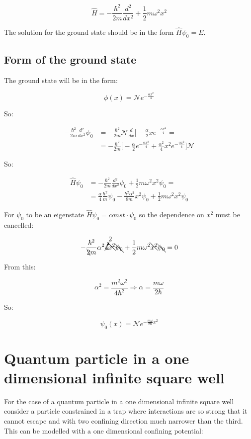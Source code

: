 $$\hat{H} = - \frac{\hbar^2}{2m}\frac{d{^2}}{d{x^2}} +\frac{1}{2}m\omega^2 x^2$$

The solution for the ground state should be in the form $\hat{H}\psi_0 = E$.

  \subsection{Form of the ground state}
  The ground state will be in the form:

  $$\phi(x) = \mathcal{N}e^{-\frac{\alpha x^2}{4}}$$

  So:

  \begin{align*}
    -\frac{\hbar^2}{2m}\frac{d{^2}}{d{x^2}}\psi_0 &= -\frac{\hbar^2}{2m}\mathcal{N}\frac{d{}}{d{x}}\biggl[-\frac{\alpha}{2}xe^{-\frac{\alpha x^2}{4}}=\\
                                                  &= -\frac{\hbar^2}{2m}\biggl[-\frac{\alpha}{2}e^{-\frac{\alpha x^2}{4}}+\frac{\alpha^2}{4}x^2e^{-\frac{\alpha x^2}{4}}\biggr]\mathcal{N}
  \end{align*}

  So:

  \begin{align*}
    \hat{H}\psi_0 &= -\frac{\hbar^2}{2m}\frac{d{^2}}{d{x^2}}\psi_0 + \frac{1}{2}m\omega^2x^2\psi_0=\\
                  &= \frac{\alpha}{4}\frac{\hbar^2}{m}\psi_0 -\frac{\hbar^2\alpha^2}{8m}x^2\psi_0 + \frac{1}{2}m\omega^2x^2\psi_0
  \end{align*}

  For $\psi_0$ to be an eigenstate $\hat{H}\psi_0 = const\cdot\psi_0$ so the dependence on $x^2$ must be cancelled:

  $$-\frac{\hbar^2}{\bcancel{2}m}\alpha^2\cancelto{2}{4}\bcancel{x^2}\bcancel{\psi_0} + \frac{1}{2}m\omega^2\bcancel{x^2}\bcancel{\psi_0} = 0$$

  From this:

  $$\alpha^2 = \frac{m^2\omega^2}{4\hbar^2}\Rightarrow\alpha=\frac{m\omega}{2\hbar}$$

  So:

  $$\psi_0(x) = \mathcal{N}e^{-\frac{m\omega}{2\hbar}x^2}$$

\section{Quantum particle in a one dimensional infinite square well}
For the case of a quantum particle in a one dimensional infinite square well consider a particle constrained in a trap where interactions are so strong that it cannot escape and with two confining direction much narrower than the third.
This can be modelled with a one dimensional confining potential:

